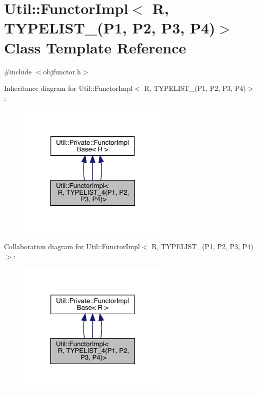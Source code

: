 \hypertarget{classUtil_1_1FunctorImpl_3_01R_00_01TYPELIST__4_07P1_00_01P2_00_01P3_00_01P4_08_4}{}\section{Util\+:\+:Functor\+Impl$<$ R, T\+Y\+P\+E\+L\+I\+S\+T\+\_(P1, P2, P3, P4)$>$ Class Template Reference}
\label{classUtil_1_1FunctorImpl_3_01R_00_01TYPELIST__4_07P1_00_01P2_00_01P3_00_01P4_08_4}


{\ttfamily \#include $<$objfunctor.\+h$>$}



Inheritance diagram for Util\+:\+:Functor\+Impl$<$ R, T\+Y\+P\+E\+L\+I\+S\+T\+\_(P1, P2, P3, P4)$>$\+:
\nopagebreak
\begin{figure}[H]
\begin{center}
\leavevmode
\includegraphics[width=206pt]{d2/d4d/classUtil_1_1FunctorImpl_3_01R_00_01TYPELIST__4_07P1_00_01P2_00_01P3_00_01P4_08_4__inherit__graph}
\end{center}
\end{figure}


Collaboration diagram for Util\+:\+:Functor\+Impl$<$ R, T\+Y\+P\+E\+L\+I\+S\+T\+\_(P1, P2, P3, P4)$>$\+:
\nopagebreak
\begin{figure}[H]
\begin{center}
\leavevmode
\includegraphics[width=206pt]{de/d13/classUtil_1_1FunctorImpl_3_01R_00_01TYPELIST__4_07P1_00_01P2_00_01P3_00_01P4_08_4__coll__graph}
\end{center}
\end{figure}
